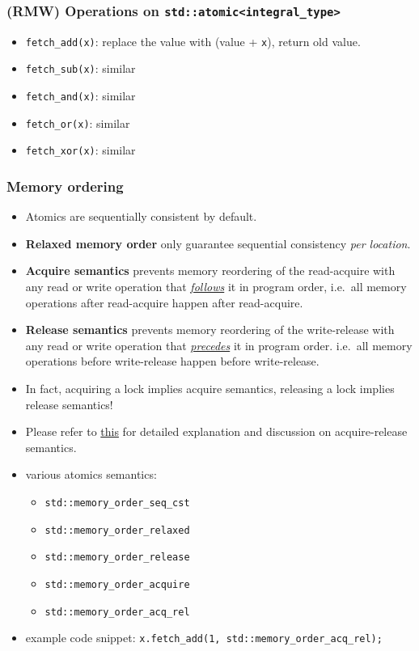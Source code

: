 \documentclass[twocolumn,landscape,10pt]{article}
\theoremstyle{definition}
\begin{document}
\subsubsection{(RMW) Operations on \texttt{std::atomic<integral\_type>}}

\begin{itemize}
    \item \texttt{fetch\_add(x)}: replace the value with (value + \texttt{x}),
        return old value.
    \item \texttt{fetch\_sub(x)}: similar
    \item \texttt{fetch\_and(x)}: similar
    \item \texttt{fetch\_or(x)}: similar
    \item \texttt{fetch\_xor(x)}: similar
\end{itemize} 

\subsubsection{Memory ordering}
\begin{itemize}
    \item Atomics are sequentially consistent by default.
    \item \textbf{Relaxed memory order} only guarantee sequential consistency
        \emph{per location}.
    \item
        \textbf{Acquire semantics} prevents memory reordering of the
        read-acquire with any read or write operation that 
        \underline{\emph{follows}} it in program order,
        i.e.\ all memory operations after read-acquire happen after
        read-acquire.
    \item
        \textbf{Release semantics} prevents memory reordering of the
        write-release with any read or write operation that
        \underline{\emph{precedes}} it in program order.
        i.e.\ all memory operations before write-release happen before
        write-release.
    \item In fact, acquiring a lock implies acquire semantics, releasing a lock
        implies release semantics!
    \item Please refer to
        \href{https://preshing.com/20120913/acquire-and-release-semantics}{this}
        for detailed explanation and discussion on acquire-release semantics.
    \item various atomics semantics:
        \begin{itemize}
            \item \texttt{std::memory\_order\_seq\_cst}
            \item \texttt{std::memory\_order\_relaxed}
            \item \texttt{std::memory\_order\_release}
            \item \texttt{std::memory\_order\_acquire}
            \item \texttt{std::memory\_order\_acq\_rel}
        \end{itemize} 
    \item example code snippet:
        \texttt{x.fetch\_add(1, std::memory\_order\_acq\_rel);}
\end{itemize} 
\end{document}
